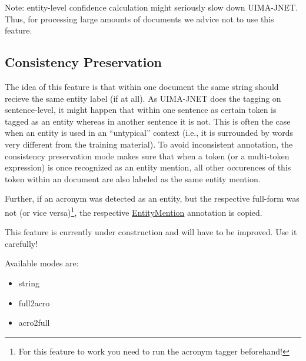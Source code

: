 \documentclass[11pt,a4paper,halfparskip]{scrartcl}
\begin{document}
Note: entity-level confidence calculation might seriously slow down
UIMA-JNET. Thus, for processing large amounts of documents we advice
not to use this feature.

\subsection{Consistency Preservation}
\label{sss:consistencypres}
The idea of this feature is that within one document the same string
should recieve the same entity label (if at all). As UIMA-JNET does
the tagging on sentence-level, it might happen that within one
sentence as certain token is tagged as an entity whereas in another
sentence it is not. This is often the case when an entity is used in
an ``untypical'' context (i.e., it is surrounded by words very
different from the training material). To avoid inconsistent
annotation, the consistency preservation mode makes sure that when a
token (or a multi-token expression) is once recognized as an entity
mention, all other occurences of this token within an document are
also labeled as the same entity mention.

Further, if an acronym was detected as an entity, but the respective
full-form was not (or vice versa)\footnote{For this feature to work
  you need to run the acronym tagger beforehand!}, the respective
\url{EntityMention} annotation is copied.

This feature is currently under construction and will have to be
improved. Use it carefully!

Available modes are:
\begin{itemize}
\item string
\item full2acro
\item acro2full
\end{itemize}
\end{document}
